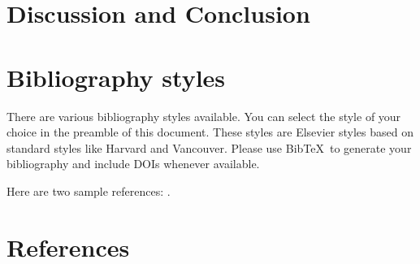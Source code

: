 \documentclass[review, twocolumn]{elsarticle}
\begin{document}
\section{Discussion and Conclusion}

\section{Bibliography styles}

There are various bibliography styles available. You can select the style of your choice in the preamble of this document. These styles are Elsevier styles based on standard styles like Harvard and Vancouver. Please use Bib\TeX\ to generate your bibliography and include DOIs whenever available.

Here are two sample references: \cite{Feynman1963118,Dirac1953888}.

\section*{References}


\end{document}
